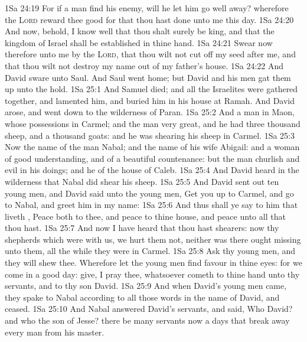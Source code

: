 \vs 1Sa 24:19 For if a man find his enemy, will he let him go well away? wherefore the \textsc{Lord} reward thee good for that thou hast done unto me this day.
\vs 1Sa 24:20 And now, behold, I know well that thou shalt surely be king, and that the kingdom of Israel shall be established in thine hand.
\vs 1Sa 24:21 Swear now therefore unto me by the \textsc{Lord}, that thou wilt not cut off my seed after me, and that thou wilt not destroy my name out of my father's house.
\vs 1Sa 24:22 And David sware unto Saul. And Saul went home; but David and his men gat them up unto the hold.
\vs 1Sa 25:1 And Samuel died; and all the Israelites were gathered together, and lamented him, and buried him in his house at Ramah. And David arose, and went down to the wilderness of Paran.
\vs 1Sa 25:2 And  a man in Maon, whose possessions  in Carmel; and the man  very great, and he had three thousand sheep, and a thousand goats: and he was shearing his sheep in Carmel.
\vs 1Sa 25:3 Now the name of the man  Nabal; and the name of his wife Abigail: and  a woman of good understanding, and of a beautiful countenance: but the man  churlish and evil in his doings; and he  of the house of Caleb.
\vs 1Sa 25:4 And David heard in the wilderness that Nabal did shear his sheep.
\vs 1Sa 25:5 And David sent out ten young men, and David said unto the young men, Get you up to Carmel, and go to Nabal, and greet him in my name:
\vs 1Sa 25:6 And thus shall ye say to him that liveth , Peace  both to thee, and peace  to thine house, and peace  unto all that thou hast.
\vs 1Sa 25:7 And now I have heard that thou hast shearers: now thy shepherds which were with us, we hurt them not, neither was there ought missing unto them, all the while they were in Carmel.
\vs 1Sa 25:8 Ask thy young men, and they will shew thee. Wherefore let the young men find favour in thine eyes: for we come in a good day: give, I pray thee, whatsoever cometh to thine hand unto thy servants, and to thy son David.
\vs 1Sa 25:9 And when David's young men came, they spake to Nabal according to all those words in the name of David, and ceased.
\vs 1Sa 25:10 And Nabal answered David's servants, and said, Who  David? and who  the son of Jesse? there be many servants now a days that break away every man from his master.
